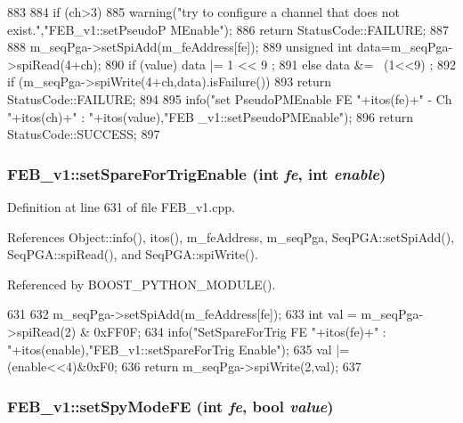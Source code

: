 \begin{DoxyCode}
883                                                                 {
884   if (ch>3){
885     warning("try to configure a channel that does not exist.","FEB_v1::setPseudoP
      MEnable");
886     return StatusCode::FAILURE;
887   }
888   m_seqPga->setSpiAdd(m_feAddress[fe]);
889   unsigned int data=m_seqPga->spiRead(4+ch);
890   if (value)  data |= 1 << 9 ;
891   else        data &= ~(1<<9) ;
892   if (m_seqPga->spiWrite(4+ch,data).isFailure()){
893     return StatusCode::FAILURE;
894   }
895   info("set PseudoPMEnable FE "+itos(fe)+" - Ch "+itos(ch)+" : "+itos(value),"FEB
      _v1::setPseudoPMEnable");
896   return StatusCode::SUCCESS;
897 }
\end{DoxyCode}
\hypertarget{classFEB__v1_ae8e531b961f91ac974a75c43937acf78}{
\subsubsection[{setSpareForTrigEnable}]{ FEB\_\-v1::setSpareForTrigEnable (int {\em fe}, \/  int {\em enable})}}
\label{classFEB__v1_ae8e531b961f91ac974a75c43937acf78}


Definition at line 631 of file FEB\_\-v1.cpp.

References Object::info(), itos(), m\_\-feAddress, m\_\-seqPga, SeqPGA::setSpiAdd(), SeqPGA::spiRead(), and SeqPGA::spiWrite().

Referenced by BOOST\_\-PYTHON\_\-MODULE().


\begin{DoxyCode}
631                                                            {
632   m_seqPga->setSpiAdd(m_feAddress[fe]);
633   int val = m_seqPga->spiRead(2) & 0xFF0F;
634   info("SetSpareForTrig FE "+itos(fe)+" : "+itos(enable),"FEB_v1::setSpareForTrig
      Enable");
635   val |= (enable<<4)&0xF0;
636   return m_seqPga->spiWrite(2,val);
637 }
\end{DoxyCode}
\hypertarget{classFEB__v1_ab88d23abb96f746298e0fa1e1cf63e3e}{
\subsubsection[{setSpyModeFE}]{ FEB\_\-v1::setSpyModeFE (int {\em fe}, \/  bool {\em value})}}
\label{classFEB__v1_ab88d23abb96f746298e0fa1e1cf63e3e}



